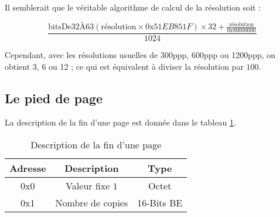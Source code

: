 Il semblerait que le véritable algorithme de calcul de la résolution soit :

\begin{equation*}
\frac{\textrm{bitsDe32À63}(\textrm{résolution} \times \textrm{0x}51EB851F)
\times 32 + \frac{\textrm{résolution}}{\textrm{0x}80000000}}{1024}
\end{equation*}

Cependant, avec les résolutions usuelles de 300ppp, 600ppp ou 1200ppp, on
obtient 3, 6 ou 12 ; ce qui est équivalent à diviser la résolution par $100$.


\subsection{Le pied de page}
La description de la fin d'une page est donnée dans le tableau
\ref{tab:fin_page}.

\begin{table}[!ht]
\centering
\begin{tabular}{| c | c | c |}
\hline
\textbf{Adresse} & \textbf{Description} & \textbf{Type} \\
\hline
\hline
0x0 & Valeur fixe $1$ & Octet \\
0x1 & Nombre de copies & 16-Bits BE \\
\hline
\end{tabular}
\caption{Description de la fin d'une page}
\label{tab:fin_page}
\end{table}
